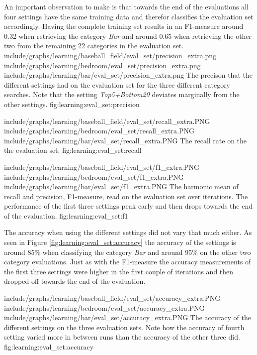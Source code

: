 An important observation to make is that towards the end of the evaluations all four settings have the same training data and therefor classifies the evaluation set accordingly. Having the complete training set results in an F1-measure around 0.32 when retrieving the category \emph{Bar} and around 0.65 when retrieving the other two from the remaining 22 categories in the evaluation set.
\tripfigurenear
{include/graphs/learning/baseball_field/eval_set/precision_extra.png}
{include/graphs/learning/bedroom/eval_set/precision_extra.png}
{include/graphs/learning/bar/eval_set/precision_extra.png}
{The precison that the different settings had on the evaluation set for the three different category searches. Note that the setting \emph{Top5+Bottom20} deviates marginally from the other settings.}
{fig:learning:eval_set:precision}


\tripfigurenear
{include/graphs/learning/baseball_field/eval_set/recall_extra.PNG}
{include/graphs/learning/bedroom/eval_set/recall_extra.PNG}
{include/graphs/learning/bar/eval_set/recall_extra.PNG}
{The recall rate on the the evaluation set.}
{fig:learning:eval_set:recall}

\tripfigurenear
{include/graphs/learning/baseball_field/eval_set/f1_extra.PNG}
{include/graphs/learning/bedroom/eval_set/f1_extra.PNG}
{include/graphs/learning/bar/eval_set/f1_extra.PNG}
{The harmonic mean of recall and precision, F1-measure, read on the evaluation set over iterations. The performance of the first three settings peak early and then drops towards the end of the evaluation.}
{fig:learning:eval_set:f1}

The accuracy when using the different settings did not vary that much either. As seen in Figure \ref{fig:learning:eval_set:accuracy} the accuracy of the settings is around 85\% when classifying the category \emph{Bar} and around 95\% on the other two category evaluations. Just as with the F1-measure the accuracy measurements of the first three settings were higher in the first couple of iterations and then dropped off towards the end of the evaluation. 

\tripfigure
{include/graphs/learning/baseball_field/eval_set/accuracy_extra.PNG}
{include/graphs/learning/bedroom/eval_set/accuracy_extra.PNG}
{include/graphs/learning/bar/eval_set/accuracy_extra.PNG}
{The accuracy of the different settings on the three evaluation sets. Note how the accuracy of fourth setting varied more in between runs than the accuracy of the other three did.}
{fig:learning:eval_set:accuracy}

